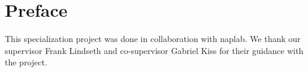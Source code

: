 \chapter*{Preface}
This specialization project was done in collaboration with \acrfull{naplab}. We thank our supervisor Frank Lindseth and co-supervisor Gabriel Kiss for their guidance with the project.

